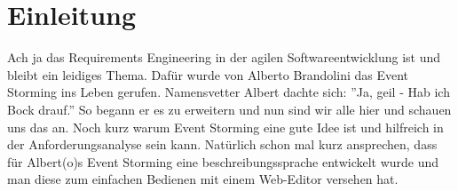 \chapter{Einleitung}\label{ch:einleitung}
Ach ja das Requirements Engineering in der agilen Softwareentwicklung ist
und bleibt ein leidiges Thema.
Dafür wurde von Alberto Brandolini das Event Storming ins Leben gerufen.
Namensvetter Albert dachte sich: ''Ja, geil - Hab ich Bock drauf.''
So begann er es zu erweitern und nun sind wir alle hier und schauen uns das an.
Noch kurz warum Event Storming eine gute Idee ist und hilfreich in der
Anforderungsanalyse sein kann.
Natürlich schon mal kurz ansprechen, dass für Albert(o)s Event Storming eine
beschreibungssprache entwickelt wurde und man diese zum einfachen Bedienen
mit einem Web-Editor versehen hat.
